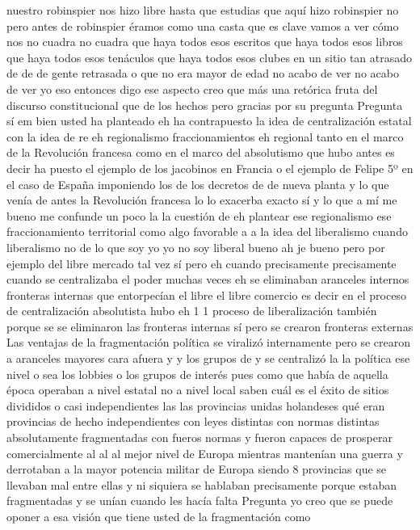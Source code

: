 nuestro robinspier nos hizo libre hasta que estudias que aquí hizo robinspier no pero antes de robinspier éramos como una casta
que es clave vamos a ver cómo nos no cuadra no cuadra que haya todos esos escritos que haya todos esos libros
que haya todos esos tenáculos que haya todos esos clubes en un sitio tan atrasado de de de gente retrasada o que no era mayor de edad
no acabo de ver no acabo de ver yo eso entonces digo ese aspecto creo que más una retórica
fruta del discurso constitucional que de los hechos pero gracias por su pregunta
Pregunta
sí em bien usted ha planteado eh
ha contrapuesto la idea de centralización estatal con la idea de re eh regionalismo
fraccionamientos eh regional tanto en el marco de la Revolución francesa
como en el marco del absolutismo que hubo antes es decir ha puesto el ejemplo de los jacobinos en Francia
o el ejemplo de Felipe 5º en el caso de España imponiendo los de los decretos de de nueva planta
y lo que venía de antes la Revolución francesa lo lo exacerba exacto sí y lo que a mí me bueno
me confunde un poco la la cuestión de eh plantear ese regionalismo ese fraccionamiento territorial
como algo favorable a a la idea del liberalismo cuando liberalismo no de lo que soy yo
yo no soy liberal bueno ah je bueno pero por ejemplo del libre mercado tal vez sí
pero eh cuando precisamente precisamente cuando se centralizaba el poder muchas veces eh
se eliminaban aranceles internos fronteras internas que entorpecían el libre el libre comercio
es decir en el proceso de centralización absolutista hubo eh 1 1 proceso de liberalización también
porque se se eliminaron las fronteras internas sí pero se crearon fronteras externas
Las ventajas de la fragmentación política
se viralizó internamente pero se crearon a aranceles mayores cara afuera y y los grupos de y se centralizó la la política
ese nivel o sea los lobbies o los grupos de interés pues como que había de aquella época operaban a nivel estatal no a nivel local
saben cuál es el éxito de sitios divididos o casi independientes las las provincias unidas holandeses
qué eran provincias de hecho independientes con leyes distintas con normas distintas
absolutamente fragmentadas con fueros normas y fueron capaces de prosperar comercialmente al al al mejor nivel de Europa
mientras mantenían una guerra y derrotaban a la mayor potencia militar de Europa siendo 8 provincias que se llevaban mal entre ellas
y ni siquiera se hablaban precisamente porque estaban fragmentadas y se unían cuando les hacía falta
Pregunta
yo creo que se puede oponer a esa visión que tiene usted de la fragmentación como
